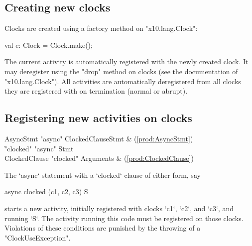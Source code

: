 \subsection{Creating new clocks}\label{sec:clock:create}

Clocks are created using a factory method on \xcd"x10.lang.Clock":


\begin{xten}
val c: Clock = Clock.make();
\end{xten}


The current activity is automatically registered with the newly
created clock.  It may deregister using the \xcd"drop" method on
clocks (see the documentation of \xcd"x10.lang.Clock"). All activities
are automatically deregistered from all clocks they are registered
with on termination (normal or abrupt).

\subsection{Registering new activities on clocks}
\label{sec:clock:register}

\begin{bbgrammar}
           AsyncStmt \: \xcd"async" ClockedClause\opt Stmt & (\ref{prod:AsyncStmt}) \\
                     \| \xcd"clocked" \xcd"async" Stmt \\
       ClockedClause \: \xcd"clocked" Arguments & (\ref{prod:ClockedClause}) \\
\end{bbgrammar}

The \xcd`async` statement with a \xcd`clocked` clause of either form, say 
\begin{xten}
  async clocked (c1, c2, c3) S
\end{xten}
starts a new activity, initially registered with
clocks \xcd`c1`, \xcd`c2`, and \xcd`c3`, and  running \xcd`S`. The activity running this code must
be registered on those clocks. 
Violations of these conditions are punished by the throwing of a
\xcd"ClockUseException". 

